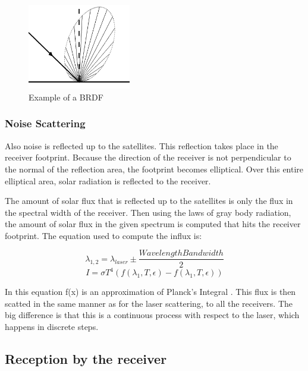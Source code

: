 \begin{figure}[ht!]
\centering
\includegraphics[width=0.4\textwidth]{chapters/img/scatter.png}
\caption{Example of a \ac{BRDF}}
\label{fig:scatter}
\end{figure}



\subsubsection{Noise Scattering}

Also noise is reflected up to the satellites. This reflection takes place in the receiver footprint. Because the direction of the receiver is not perpendicular to the normal of the reflection area, the footprint becomes elliptical. Over this entire elliptical area, solar radiation is reflected to the receiver.

The amount of solar flux that is reflected up to the satellites is only the flux in the spectral width of the receiver. Then using the laws of gray body radiation, the amount of solar flux in the given spectrum is computed that hits the receiver footprint. The equation used to compute the influx is:

\begin{equation}
	\lambda_{1,2} = \lambda _{laser} \pm \frac{Wavelength Bandwidth}{2}
\end{equation}
\begin{equation}
	I = \sigma T^4 (f(\lambda _1, T, \epsilon) - f(\lambda _1, T, \epsilon))
\end{equation}

In this equation f(x) is an approximation of Planck's Integral \cite[p.~26]{rees}. This flux is then scatted in the same manner as for the laser scattering, to all the receivers. The big difference is that this is a continuous process with respect to the laser, which happens in discrete steps.

\subsection{Reception by the receiver}

